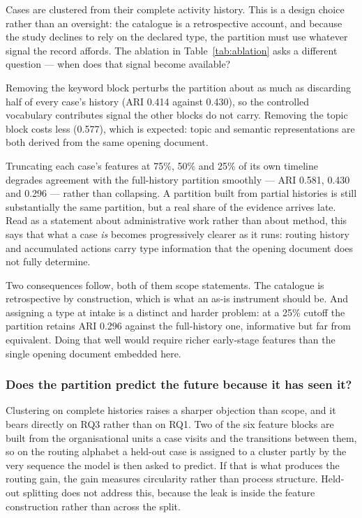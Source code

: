 Cases are clustered from their complete activity history. This is a design choice rather than an
oversight: the catalogue is a retrospective account, and because the study declines to rely on
the declared type, the partition must use whatever signal the record affords. The ablation in
Table~\ref{tab:ablation} asks a different question --- when does that signal become available?

Removing the keyword block perturbs the partition about as much as discarding half of every
case's history (ARI 0.414 against 0.430), so the controlled vocabulary contributes signal the
other blocks do not carry. Removing the topic block costs less (0.577), which is expected: topic
and semantic representations are both derived from the same opening document.

Truncating each case's features at 75\%, 50\% and 25\% of its own timeline degrades agreement
with the full-history partition smoothly --- ARI 0.581, 0.430 and 0.296 --- rather than
collapsing. A partition built from partial histories is still substantially the same partition,
but a real share of the evidence arrives late. Read as a statement about administrative work
rather than about method, this says that what a case \emph{is} becomes progressively clearer as
it runs: routing history and accumulated actions carry type information that the opening
document does not fully determine.

Two consequences follow, both of them scope statements. The catalogue is retrospective by
construction, which is what an as-is instrument should be. And assigning a type at intake is a
distinct and harder problem: at a 25\% cutoff the partition retains ARI 0.296 against the
full-history one, informative but far from equivalent. Doing that well would require richer
early-stage features than the single opening document embedded here.

\subsubsection{Does the partition predict the future because it has seen it?}\label{sec:holdout}

Clustering on complete histories raises a sharper objection than scope, and it bears directly on
RQ3 rather than on RQ1. Two of the six feature blocks are built from the organisational units a
case visits and the transitions between them, so on the routing alphabet a held-out case is
assigned to a cluster partly by the very sequence the model is then asked to predict. If that is
what produces the routing gain, the gain measures circularity rather than process structure.
Held-out splitting does not address this, because the leak is inside the feature construction
rather than across the split.

